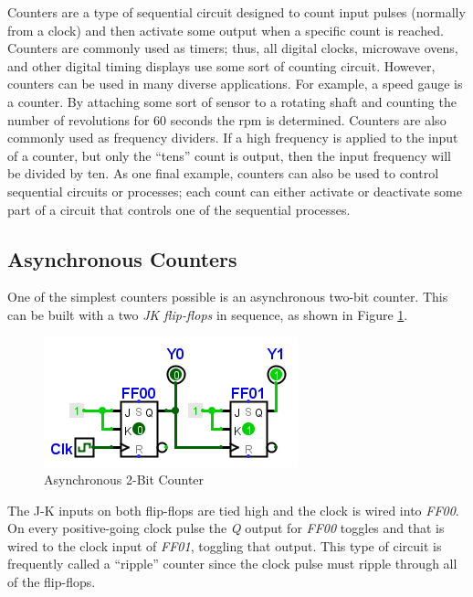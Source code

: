 Counters are a type of sequential circuit designed to count input pulses (normally from a clock) and then activate some output when a specific count is reached. Counters are commonly used as timers; thus, all digital clocks, microwave ovens, and other digital timing displays use some sort of counting circuit. However, counters can be used in many diverse applications. For example, a speed gauge is a counter. By attaching some sort of sensor to a rotating shaft and counting the number of revolutions for $ 60 $ seconds the \gls{rpm} is determined. Counters are also commonly used as frequency dividers. If a high frequency is applied to the input of a counter, but only the ``tens'' count is output, then the input frequency will be divided by ten. As one final example, counters can also be used to control sequential circuits or processes; each count can either activate or deactivate some part of a circuit that controls one of the sequential processes. 

\subsection{Asynchronous Counters}
\label{SL:subsec:asynchronous_counters}

One of the simplest counters possible is an asynchronous two-bit counter. This can be built with a two \emph{JK flip-flops} in sequence, as shown in Figure \ref{fig:09_10}.

\begin{figure}[H]
	\centering
	\includegraphics[width=\maxwidth{.95\linewidth}]{gfx/09_10}
	\caption{Asynchronous 2-Bit Counter}
	\label{fig:09_10}
\end{figure}

The J-K inputs on both flip-flops are tied high and the clock is wired into \emph{FF00}. On every positive-going clock pulse the \emph{Q} output for \emph{FF00} toggles and that is wired to the clock input of \emph{FF01}, toggling that output. This type of circuit is frequently called a ``ripple'' counter since the clock pulse must ripple through all of the flip-flops.

